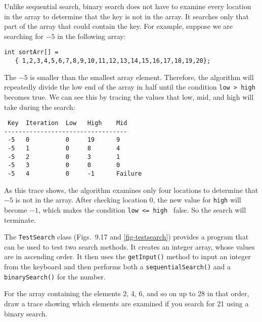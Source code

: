 Unlike sequential search, binary search does not have to examine every
location in the array to determine that the key is not in the array.
It searches only that part of the array that could contain the key.
For example, suppose we are searching for $-5$ in the following array:

\begin{jjjlisting}
\begin{lstlisting}
int sortArr[] = 
   { 1,2,3,4,5,6,7,8,9,10,11,12,13,14,15,16,17,18,19,20};
\end{lstlisting}
\end{jjjlisting}

\noindent The $-5$ is
smaller than the smallest array element. Therefore, the algorithm will
repeatedly divide the low end of the array in half until the condition
\verb|low > high| becomes true.  We can see this by tracing the values
that low, mid, and high will take during the search:

\begin{jjjlisting}
\begin{lstlisting}
 Key  Iteration  Low   High    Mid
----------------------------------
 -5   0          0     19      9
 -5   1          0     8       4
 -5   2          0     3       1
 -5   3          0     0       0
 -5   4          0     -1      Failure
\end{lstlisting}
\end{jjjlisting}

\noindent As this trace shows, the algorithm examines only
four locations to determine that $-5$ is not in the array.
After checking location 0, the new value for {\tt high} will become
$-1$, which makes the condition \verb|low <= high | false.  So the
search will terminate.


The {\tt TestSearch} class (Figs.~9.17 and \ref{fig-testsearch})
provides a  program that can be used to test two search methods.
It creates an integer array, whose values are in ascending order.  It
then uses the {\tt getInput()} method to input an integer from the
keyboard and then performs both a {\tt sequentialSearch()} and a {\tt
binarySearch()} for the number.


\begin{SSTUDY}

\item  For the array containing the elements 2, 4, 6, and so on up to 28 in
that order, draw a trace showing which elements are examined if you
search for 21 using a binary search.

\end{SSTUDY}

